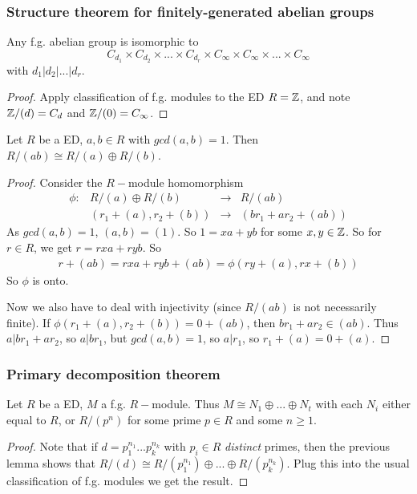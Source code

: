 \documentclass[a4paper]{article}
\begin{document}
\subsubsection{Structure theorem for finitely-generated abelian groups}
Any f.g. abelian group is isomorphic to $$C_{d_1} \times C_{d_2} \times ... \times C_{d_r} \times C_\infty \times C_\infty \times ... \times C_\infty$$ with $d_1|d_2|...|d_r$.
\begin{proof}
Apply classification of f.g. modules to the ED $R=\mathbb{Z}$, and note $\mathbb{Z}/(d)=C_d$ and $\mathbb{Z}/(0) = C_\infty$.
\end{proof}

\begin{lemma}
Let $R$ be a ED, $a,b \in R$ with $gcd(a,b) = 1$. Then $R/(ab)\cong R/(a) \oplus R/(b)$.
\begin{proof}
Consider the $R-$module homomorphism
\begin{equation*}
\begin{aligned}
\phi: &R/(a) \oplus R/(b) &\to &R/(ab)\\
&(r_1+(a),r_2+(b)) &\to &(br_1+ar_2+(ab))
\end{aligned}
\end{equation*}
As $gcd(a,b) = 1$, $(a,b) = (1)$. So $1=xa+yb$ for some $x,y \in \mathbb{Z}$. So for $r \in R$, we get $r= rxa+ryb$. So
\begin{equation*}
\begin{aligned}
r+(ab) = rxa+ryb+(ab) = \phi(ry+(a),rx+(b))
\end{aligned}
\end{equation*}
So $\phi$ is onto.

Now we also have to deal with injectivity (since $R/(ab)$ is not necessarily finite). If $\phi(r_1+(a),r_2+(b))=0+(ab)$, then $br_1+ar_2 \in (ab)$. Thus $a|br_1+ar_2$, so $a|br_1$, but $gcd(a,b)=1$, so $a|r_1$, so $r_1+(a) = 0+(a)$.
\end{proof}
\end{lemma}

\subsubsection{Primary decomposition theorem}
Let $R$ be a ED, $M$ a f.g. $R-$module. Thus $M \cong N_1 \oplus ... \oplus N_t$ with each $N_i$ either equal to $R$, or $R/(p^n)$ for some prime $p \in R$ and some $n \geq 1$.
\begin{proof}
Note that if $d=p_1^{n_1}...p_k^{n_k}$ with $p_i \in R$ \emph{distinct} primes, then the previous lemma shows that $R/(d) \cong R/(p_1^{n_1}) \oplus ... \oplus R/(p_k^{n_k})$. Plug this into the usual classification of f.g. modules we get the result.
\end{proof}
\end{document}
